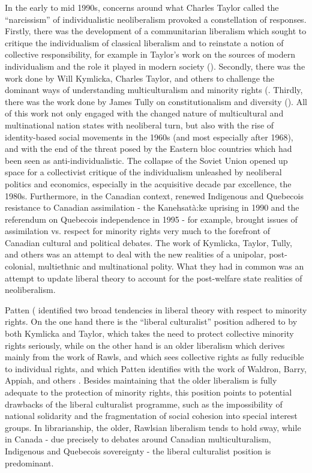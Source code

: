 \documentclass[12pt,oneside]{memoir}
\begin{document}
In the early to mid 1990s, concerns around what Charles Taylor called the ``narcissism'' of individualistic neoliberalism provoked a constellation of responses. Firstly, there was the  development of a communitarian liberalism which sought to critique the individualism of classical liberalism and to reinstate a notion of collective responsibility, for example in Taylor's work on the sources of modern individualism and the role it played in modern society (\cite{taylor-1989, Taylor-1991}). Secondly, there was the work done by Will Kymlicka, Charles Taylor, and others to challenge the dominant ways of understanding multiculturalism and minority rights (\cite{kymlicka-citizenship, taylor-1992, honneth-1995, fraser-1997}. Thirdly, there was the work done by James Tully on constitutionalism and diversity (\cite{tully-1995}). All of this work not only engaged with the changed nature of multicultural and multinational nation states with neoliberal turn, but also with the rise of identity-based social movements in the 1960s (and most especially after 1968), and with the end of the threat posed by the Eastern bloc countries which had been seen as anti-individualistic. The collapse of the Soviet Union opened up space for a collectivist critique of the individualism unleashed by neoliberal politics and economics, especially in the acquisitive decade par excellence, the 1980s. Furthermore, in the Canadian context, renewed Indigenous and Quebecois resistance to Canadian assimilation - the Kanehsatà:ke uprising in 1990 and the referendum on Quebecois independence in 1995 - for example, brought issues of assimilation vs. respect for minority rights very much to the forefront of Canadian cultural and political debates. The work of Kymlicka, Taylor, Tully, and others was an attempt to deal with the new realities of a unipolar, post-colonial, multiethnic and multinational polity. What they had in common was an attempt to update liberal theory to account for the post-welfare state realities of neoliberalism.

Patten (\cite{patten-2014} identified two broad tendencies in liberal theory with respect to minority rights. On the one hand there is the ``liberal culturalist'' position adhered to by both Kymlicka and Taylor, which takes the need to protect collective minority rights seriously, while on the other hand is an older liberalism which derives mainly from the work of Rawls, and which sees collective rights as fully reducible to individual rights, and which Patten identifies with the work of Waldron, Barry, Appiah, and others \cite[4]{patten-2014}. Besides maintaining that the older liberalism is fully adequate to the protection of minority rights, this position points to potential drawbacks of the liberal culturalist programme, such as the impossibility of national solidarity and the fragmentation of social cohesion into special interest groups. In librarianship, the older, Rawlsian liberalism tends to hold sway, while in Canada - due precisely to debates around Canadian multiculturalism, Indigenous and Quebecois sovereignty - the liberal culturalist position is predominant.
\end{document}
